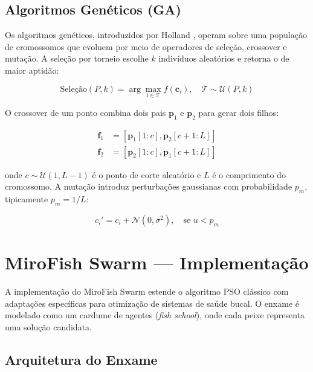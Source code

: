 \subsection{Algoritmos Genéticos (GA)}

Os algoritmos genéticos, introduzidos por Holland \cite{holland1992ga}, operam sobre uma população de cromossomos que evoluem por meio de operadores de seleção, crossover e mutação. A seleção por torneio escolhe $k$ indivíduos aleatórios e retorna o de maior aptidão:

\begin{equation}
\text{Seleção}(P, k) = \arg\max_{i \in \mathcal{T}} f(\mathbf{c}_i), \quad \mathcal{T} \sim \mathcal{U}(P, k)
\label{eq:ga_selection}
\end{equation}

O crossover de um ponto combina dois pais $\mathbf{p}_1$ e $\mathbf{p}_2$ para gerar dois filhos:

\begin{equation}
\begin{aligned}
\mathbf{f}_1 &= [\mathbf{p}_1[1:c], \mathbf{p}_2[c+1:L]] \\
\mathbf{f}_2 &= [\mathbf{p}_2[1:c], \mathbf{p}_1[c+1:L]]
\end{aligned}
\label{eq:ga_crossover}
\end{equation}

onde $c \sim \mathcal{U}(1, L-1)$ é o ponto de corte aleatório e $L$ é o comprimento do cromossomo. A mutação introduz perturbações gaussianas com probabilidade $p_m$, tipicamente $p_m = 1/L$:

\begin{equation}
c_i' = c_i + \mathcal{N}(0, \sigma^2), \quad \text{se } u < p_m
\label{eq:ga_mutation}
\end{equation}

\section{MiroFish Swarm --- Implementação}

A implementação do MiroFish Swarm estende o algoritmo PSO clássico com adaptações específicas para otimização de sistemas de saúde bucal. O enxame é modelado como um cardume de agentes (\textit{fish school}), onde cada peixe representa uma solução candidata.

\subsection{Arquitetura do Enxame}

